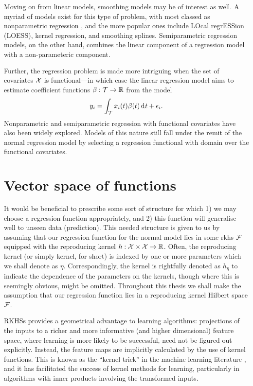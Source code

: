 \documentclass[a4paper,showframe,11pt]{report}
\begin{document}
Moving on from linear models, smoothing models may be of interest as well.
A myriad of models exist for this type of problem, with most classed as nonparametric regression \citep{wassermann2006all}, and the more popular ones include LOcal regrESSion (LOESS), kernel regression, and smoothing splines.
Semiparametric regression models, on the other hand, combines the linear component of a regression model with a non-parameteric component.

Further, the regression problem is made more intriguing when the set of covariates ${\mathcal X}$ is functional---in which case the linear regression model aims to estimate coefficient functions $\beta:{\mathcal T} \to \mathbb{R}$ from the model
\[
  y_i = \int_{\mathcal T} x_i(t)\beta(t) \operatorname{d}\hspace{0.5pt}\! t + \epsilon_i.
\]
Nonparametric and semiparametric regression with functional covariates \citep{ramsay2005functional} have also been widely explored.
Models of this nature still fall under the remit of the normal regression model by selecting a regression functional with domain over the functional covariates.

\section{Vector space of functions}

It would be beneficial to prescribe some sort of structure for which 1) we may choose a regression function appropriately, and 2) this function will generalise well to unseen data (prediction). 
This needed structure is given to us by assuming that our regression function for the normal model lies in some \gls*{rkhs} ${\mathcal F}$ equipped with the reproducing kernel $h:{\mathcal X} \times {\mathcal X} \to \mathbb{R}$.
Often, the reproducing kernel (or simply kernel, for short) is indexed by one or more parameters which we shall denote as $\eta$.
Correspondingly, the kernel is rightfully denoted as $h_\eta$ to indicate the dependence of the parameters on the kernels, though where this is seemingly obvious, might be omitted.
Throughout this thesis we shall make the assumption that our regression function lies in a reproducing kernel Hilbert space ${\mathcal F}$.

RKHSs provides a geometrical advantage to learning algorithms: projections of the inputs to a richer and more informative (and higher dimensional) feature space, where learning is more likely to be successful, need not be figured out explicitly.
Instead, the feature maps are implicitly calculated by the use of kernel functions. 
This is known as the ``kernel trick'' in the machine learning literature \citep{hofmann2008kernel}, and it has facilitated the success of kernel methods for learning, particularly in algorithms with inner products involving the transformed inputs. 
\end{document}
